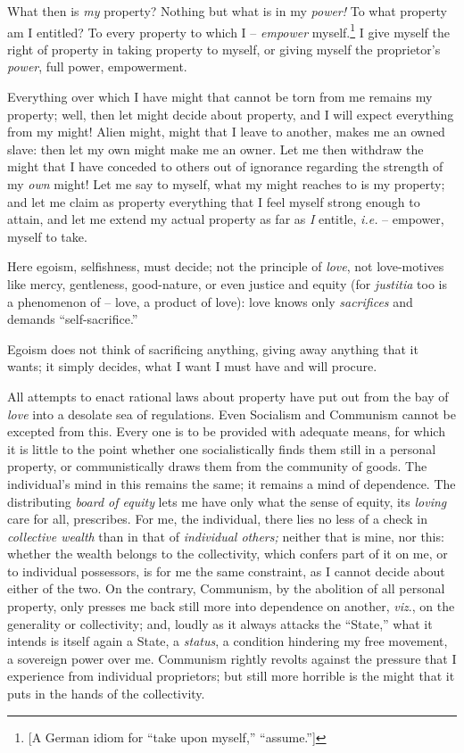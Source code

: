 \documentclass[12pt,a4paper]{book}
\begin{document}
What then is \textit{my} property? Nothing but what is in my \textit{power!} 
To what property am I entitled? To every property to which I -- 
\textit{empower} myself.\footnote{[A German idiom for ``take upon myself,'' 
``assume.'']} I give myself the right of property in taking property to 
myself, or giving myself the proprietor's \textit{power}, full power, 
empowerment.

Everything over which I have might that cannot be torn from me remains my 
property; well, then let might decide about property, and I will expect 
everything from my might! Alien might, might that I leave to another, makes me 
an owned slave: then let my own might make me an owner. Let me then withdraw 
the might that I have conceded to others out of ignorance regarding the 
strength of my \textit{own} might! Let me say to myself, what my might reaches 
to is my property; and let me claim as property everything that I feel myself 
strong enough to attain, and let me extend my actual property as far as 
\textit{I} entitle, \textit{i.e.} -- empower, myself to take.

Here egoism, selfishness, must decide; not the principle of \textit{love}, not 
love-motives like mercy, gentleness, good-nature, or even justice and equity 
(for \textit{justitia} too is a phenomenon of -- love, a product of love): 
love knows only \textit{sacrifices} and demands ``self-sacrifice.''

Egoism does not think of sacrificing anything, giving away anything that it 
wants; it simply decides, what I want I must have and will procure.

All attempts to enact rational laws about property have put out from the bay 
of \textit{love} into a desolate sea of regulations. Even Socialism and 
Communism cannot be excepted from this. Every one is to be provided with 
adequate means, for which it is little to the point whether one 
socialistically finds them still in a personal property, or communistically 
draws them from the community of goods. The individual's mind in this remains 
the same; it remains a mind of dependence. The distributing \textit{board of 
equity} lets me have only what the sense of equity, its \textit{loving} care 
for all, prescribes. For me, the individual, there lies no less of a check in 
\textit{collective wealth} than in that of \textit{individual others;} neither 
that is mine, nor this: whether the wealth belongs to the collectivity, which 
confers part of it on me, or to individual possessors, is for me the same 
constraint, as I cannot decide about either of the two. On the contrary, 
Communism, by the abolition of all personal property, only presses me back 
still more into dependence on another, \textit{viz}., on the generality or 
collectivity; and, loudly as it always attacks the ``State,'' what it 
intends is itself again a State, a \textit{status}, a condition hindering my 
free movement, a sovereign power over me. Communism rightly revolts against 
the pressure that I experience from individual proprietors; but still more 
horrible is the might that it puts in the hands of the collectivity.
\end{document}
